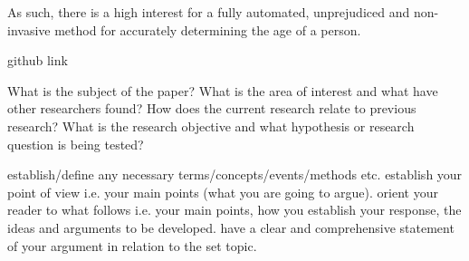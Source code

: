As such, there is a high interest for a fully automated, unprejudiced and non-invasive method for accurately determining the age of a person.



github link

What is the subject of the paper?
What is the area of interest and what have other researchers found?
How does the current research relate to previous research?
What is the research objective and what hypothesis or research question is being tested?

establish/define any necessary terms/concepts/events/methods etc.
establish your point of view i.e. your main points (what you are going to argue).
orient your reader to what follows i.e. your main points, how you establish your response, the ideas and arguments to be developed.
have a clear and comprehensive statement of your argument in relation to the set topic.

\newpage
